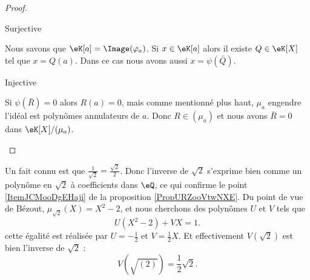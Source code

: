 \begin{proof}
\begin{enumerate}
\begin{subproof}
            \item[Surjective]

                Nous savons que \( \eK[a]=\Image(\varphi_a)\). Si \( x\in \eK[a]\) alors il existe \( Q\in \eK[X]\) tel que \( x=Q(a)\). Dans ce cas nous avons aussi \( x=\psi(\bar Q)\).

            \item[Injective]

                Si \( \psi(\bar R)=0\) alors \( R(a)=0\), mais comme mentionné plus haut, \( \mu_a\) engendre l'idéal est polynômes annulateurs de \( a\). Donc \( R\in (\mu_a)\) et nous avons \( \bar R=0\) dans \( \eK[X]/(\mu_a)\).

            \end{subproof}
                
    \end{enumerate}
\end{proof}

\begin{example}
    Un fait connu est que \( \frac{1}{ \sqrt{2} }=\frac{ \sqrt{2} }{ 2 }\). Donc l'inverse de \( \sqrt{2}\) s'exprime bien comme un polynôme en \( \sqrt{2}\) à coefficients dans \( \eQ\), ce qui confirme le point \ref{ItemJCMooDgEHaji} de la proposition \ref{PropURZooVtwNXE}. Du point de vue de Bézout, \( \mu_{\sqrt{2}}(X)=X^2-2\), et nous cherchons des polynômes \( U\) et \( V\) tels que
    \begin{equation}
        U(X^2-2)+VX=1.
    \end{equation}
    cette égalité est réalisée par \( U=-\frac{ 1 }{2}\) et \( V=\frac{ 1 }{2}X\). Et effectivement \( V(\sqrt{2})\) est bien l'inverse de \( \sqrt{2}\) :
    \begin{equation}
        V(\sqrt{(2)})=\frac{ 1 }{2}\sqrt{2}.
    \end{equation}
\end{example}
